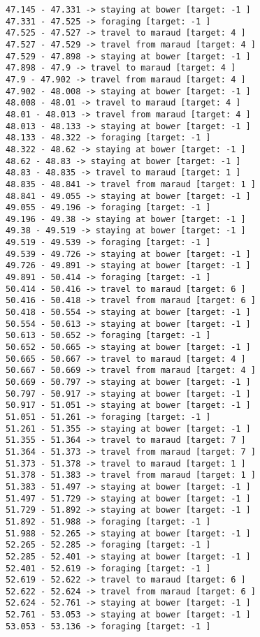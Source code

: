 \documentclass[11pt]{article}
\begin{document}
\begin{Verbatim}[commandchars=\\\{\}]
47.145 - 47.331 -> staying at bower [target: -1 ]
47.331 - 47.525 -> foraging [target: -1 ]
47.525 - 47.527 -> travel to maraud [target: 4 ]
47.527 - 47.529 -> travel from maraud [target: 4 ]
47.529 - 47.898 -> staying at bower [target: -1 ]
47.898 - 47.9 -> travel to maraud [target: 4 ]
47.9 - 47.902 -> travel from maraud [target: 4 ]
47.902 - 48.008 -> staying at bower [target: -1 ]
48.008 - 48.01 -> travel to maraud [target: 4 ]
48.01 - 48.013 -> travel from maraud [target: 4 ]
48.013 - 48.133 -> staying at bower [target: -1 ]
48.133 - 48.322 -> foraging [target: -1 ]
48.322 - 48.62 -> staying at bower [target: -1 ]
48.62 - 48.83 -> staying at bower [target: -1 ]
48.83 - 48.835 -> travel to maraud [target: 1 ]
48.835 - 48.841 -> travel from maraud [target: 1 ]
48.841 - 49.055 -> staying at bower [target: -1 ]
49.055 - 49.196 -> foraging [target: -1 ]
49.196 - 49.38 -> staying at bower [target: -1 ]
49.38 - 49.519 -> staying at bower [target: -1 ]
49.519 - 49.539 -> foraging [target: -1 ]
49.539 - 49.726 -> staying at bower [target: -1 ]
49.726 - 49.891 -> staying at bower [target: -1 ]
49.891 - 50.414 -> foraging [target: -1 ]
50.414 - 50.416 -> travel to maraud [target: 6 ]
50.416 - 50.418 -> travel from maraud [target: 6 ]
50.418 - 50.554 -> staying at bower [target: -1 ]
50.554 - 50.613 -> staying at bower [target: -1 ]
50.613 - 50.652 -> foraging [target: -1 ]
50.652 - 50.665 -> staying at bower [target: -1 ]
50.665 - 50.667 -> travel to maraud [target: 4 ]
50.667 - 50.669 -> travel from maraud [target: 4 ]
50.669 - 50.797 -> staying at bower [target: -1 ]
50.797 - 50.917 -> staying at bower [target: -1 ]
50.917 - 51.051 -> staying at bower [target: -1 ]
51.051 - 51.261 -> foraging [target: -1 ]
51.261 - 51.355 -> staying at bower [target: -1 ]
51.355 - 51.364 -> travel to maraud [target: 7 ]
51.364 - 51.373 -> travel from maraud [target: 7 ]
51.373 - 51.378 -> travel to maraud [target: 1 ]
51.378 - 51.383 -> travel from maraud [target: 1 ]
51.383 - 51.497 -> staying at bower [target: -1 ]
51.497 - 51.729 -> staying at bower [target: -1 ]
51.729 - 51.892 -> staying at bower [target: -1 ]
51.892 - 51.988 -> foraging [target: -1 ]
51.988 - 52.265 -> staying at bower [target: -1 ]
52.265 - 52.285 -> foraging [target: -1 ]
52.285 - 52.401 -> staying at bower [target: -1 ]
52.401 - 52.619 -> foraging [target: -1 ]
52.619 - 52.622 -> travel to maraud [target: 6 ]
52.622 - 52.624 -> travel from maraud [target: 6 ]
52.624 - 52.761 -> staying at bower [target: -1 ]
52.761 - 53.053 -> staying at bower [target: -1 ]
53.053 - 53.136 -> foraging [target: -1 ]

\end{Verbatim}
\end{document}
